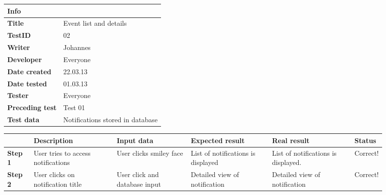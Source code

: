 \begin{figure}
\small

\begin{tabularx}{\textwidth }{|l|X|}
\hline
\cellcolor{blue!25}\textbf{Info} & \cellcolor{blue!25}\\
\hline
\textbf{Title} & Event list and details\\
\hline
\textbf{TestID} & 02\\
\hline
\textbf{Writer}& Johannes\\
\hline
\textbf{Developer}& Everyone\\
\hline
\textbf{Date created}& 22.03.13\\
\hline
\textbf{Date tested}& 01.03.13\\
\hline
\textbf{Tester}& Everyone\\
\hline
\textbf{Preceding test}& Test 01\\
\hline
\textbf{Test data} & Notifications stored in database \\
\hline
\end{tabularx}

\begin{tabularx}{\textwidth}{|X|X|X|X|X|X|}
\hline
\cellcolor{blue!25}&
\cellcolor{blue!25}Description&
\cellcolor{blue!25}Input data&
\cellcolor{blue!25}Expected result&
\cellcolor{blue!25}Real result&
\cellcolor{blue!25}Status\\
\hline
\textbf{Step 1} & User tries to access notifications  & User clicks smiley face & List of notifications is displayed & List of notifications is displayed. & Correct!\\
\hline
\textbf{Step 2} & User clicks on notification title & User click and database input & Detailed view of notification & Detailed view of notification&Correct!\\
\hline
\end{tabularx}
\label{fig:test02}
\end{figure}
